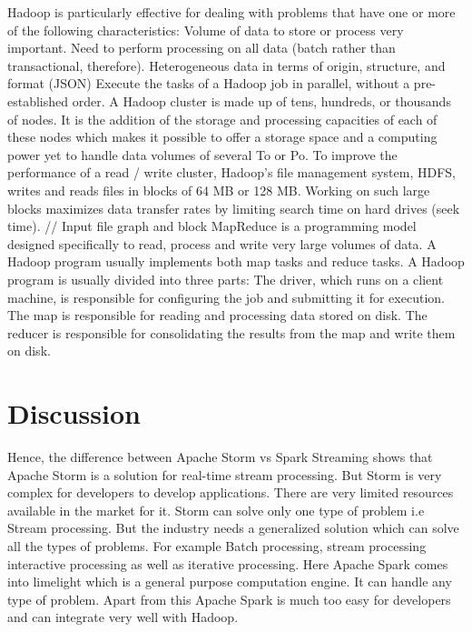 \documentclass{acmtog} %
\begin{document}
Hadoop is particularly effective for dealing with problems that have one or more of the following characteristics:
Volume of data to store or process very important.
Need to perform processing on all data (batch rather than transactional, therefore).
Heterogeneous data in terms of origin, structure, and format (JSON)
Execute the tasks of a Hadoop job in parallel, without a pre-established order.
A Hadoop cluster is made up of tens, hundreds, or thousands of nodes. It is the addition of the storage and processing capacities of each of these nodes which makes it possible to offer a storage space and a computing power yet to handle data volumes of several To or Po.
To improve the performance of a read / write cluster, Hadoop's file management system, HDFS, writes and reads files in blocks of 64 MB or 128 MB. Working on such large blocks maximizes data transfer rates by limiting search time on hard drives (seek time).
// Input file graph and block
MapReduce is a programming model designed specifically to read, process and write very large volumes of data. A Hadoop program usually implements both map tasks and reduce tasks.
A Hadoop program is usually divided into three parts:
The driver, which runs on a client machine, is responsible for configuring the job and submitting it for execution.
The map is responsible for reading and processing data stored on disk.
The reducer is responsible for consolidating the results from the map and write them on disk.

\section{Discussion}
\label{sec:results}

Hence, the difference between Apache Storm vs Spark Streaming shows that Apache Storm is a solution for real-time stream processing. But Storm is very complex for developers to develop applications. There are very limited resources available in the market for it.
Storm can solve only one type of problem i.e Stream processing. But the industry needs a generalized solution which can solve all the types of problems. For example Batch processing, stream processing interactive processing as well as iterative processing. Here Apache Spark comes into limelight which is a general purpose computation engine. It can handle any type of problem. Apart from this Apache Spark is much too easy for developers and can integrate very well with Hadoop.
\end{document}

